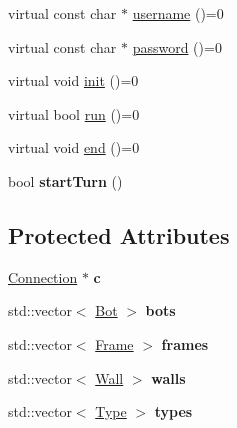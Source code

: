 \begin{DoxyCompactItemize}
\item 
virtual const char $\ast$ \hyperlink{classBaseAI_aef082fbf306fec04515ed5ed3b1ba582}{username} ()=0
\item 
virtual const char $\ast$ \hyperlink{classBaseAI_a9251e20447917cda64ad1487b903456f}{password} ()=0
\item 
virtual void \hyperlink{classBaseAI_a90ce8becd6f2e32c2cc32d41145e88df}{init} ()=0
\item 
virtual bool \hyperlink{classBaseAI_ad60148e7e9e450ce47432b07b4db1ed6}{run} ()=0
\item 
virtual void \hyperlink{classBaseAI_a60c8246a859ba2dba84b70239bc129bc}{end} ()=0
\item 
\hypertarget{classBaseAI_ac6303df0fece47e29b77dd0aa0aa4fe8}{
bool {\bfseries startTurn} ()}
\label{classBaseAI_ac6303df0fece47e29b77dd0aa0aa4fe8}

\end{DoxyCompactItemize}
\subsection*{Protected Attributes}
\begin{DoxyCompactItemize}
\item 
\hypertarget{classBaseAI_a40585cc4b7c885978fffa3b1a23cb7ce}{
\hyperlink{structConnection}{Connection} $\ast$ {\bfseries c}}
\label{classBaseAI_a40585cc4b7c885978fffa3b1a23cb7ce}

\item 
\hypertarget{classBaseAI_acbde0c7c83f67a96473a5d0125c643b6}{
std::vector$<$ \hyperlink{classBot}{Bot} $>$ {\bfseries bots}}
\label{classBaseAI_acbde0c7c83f67a96473a5d0125c643b6}

\item 
\hypertarget{classBaseAI_ae3aef01a1a99c39581f1a56077cd9777}{
std::vector$<$ \hyperlink{classFrame}{Frame} $>$ {\bfseries frames}}
\label{classBaseAI_ae3aef01a1a99c39581f1a56077cd9777}

\item 
\hypertarget{classBaseAI_a329d43ebffdcbca7d18e3be12b0afdeb}{
std::vector$<$ \hyperlink{classWall}{Wall} $>$ {\bfseries walls}}
\label{classBaseAI_a329d43ebffdcbca7d18e3be12b0afdeb}

\item 
\hypertarget{classBaseAI_a27cf9fe6e3ec8ad2d3dd259b465af021}{
std::vector$<$ \hyperlink{classType}{Type} $>$ {\bfseries types}}
\label{classBaseAI_a27cf9fe6e3ec8ad2d3dd259b465af021}

\end{DoxyCompactItemize}


